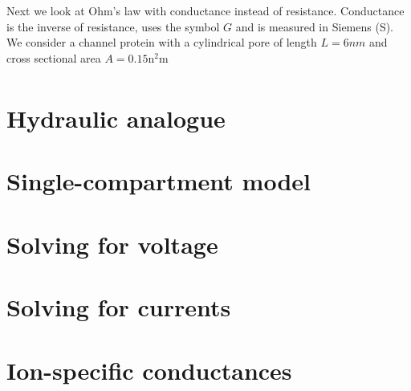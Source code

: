 Next we look at Ohm's law with conductance instead of resistance. Conductance is the inverse of resistance, uses the symbol $G$ and is measured in Siemens (\si{\siemens}). We consider a channel protein with a cylindrical pore of length $L=6\si{nm}$ and cross sectional area $A=0.15\si{\square\nano\meter}$
\begin{align*}

\end{align*}

\section{Hydraulic analogue}

\section{Single-compartment model}

\section{Solving for voltage}

\section{Solving for currents}

\section{Ion-specific conductances}
